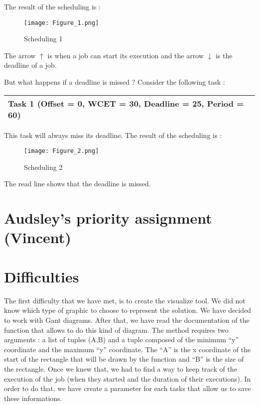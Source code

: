 \documentclass[a4paper,12pt]{article}
\begin{document}
\noindent
The result of the scheduling is : \\

\begin{figure}[h!]
  \centering
  \texttt{[image: Figure\_1.png]}
  \caption{Scheduling 1}
  \label{fig: Scheduling 1}
\end{figure}
\noindent
The arrow $\uparrow$ is when a job can start its execution and the arrow $\downarrow$ is the deadline of a job. 

\newpage 
\noindent
But what happens if a deadline is missed ? Consider the following task : \\
\begin{center}
\begin{tabular}{| l |}
\hline
Task 1 (Offset = 0, WCET = 30, Deadline = 25, Period = 60)\\
\hline
\end{tabular}
\end{center}
This task will always miss its deadline. The result of the scheduling is :\\

\begin{figure}[h!]
  \centering
  \texttt{[image: Figure\_2.png]}
  \caption{Scheduling 2}
  \label{fig: Scheduling 2}
\end{figure}
\noindent
 The read line shows that the deadline is missed. 
 
\newpage
\section{Audsley’s priority assignment (Vincent)}

\newpage

\section{Difficulties}

The first difficulty that we have met, is to create the visualize tool. We did not know which type of graphic to choose to represent the solution. We have decided to work with Gant diagrams. After that, we have read the documentation of the function that allows to do this kind of diagram. The method requires two arguments : a list of tuples (A,B) and a tuple composed of the minimum ``y'' coordinate and the maximum ``y'' coordinate. The ``A'' is the x coordinate of the start of the rectangle that will be drawn by the function and ``B'' is the size of the rectangle. Once we knew that, we had to find a way to keep track of the execution of the job (when they started and the duration of their executions). In order to do that, we have create a parameter for each tasks that allow us to save these informations. \\
\end{document}
